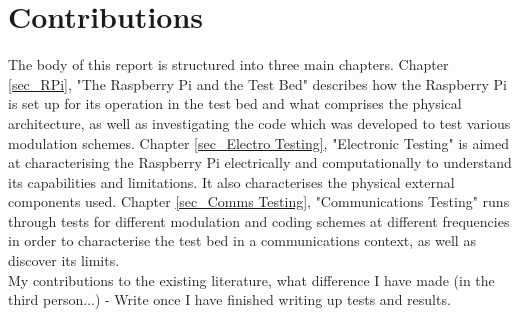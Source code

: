 \documentclass[../main.tex]{subfiles}
\begin{document}

\section{Contributions}

The body of this report is structured into three main chapters.
Chapter \ref{sec_RPi}, "The Raspberry Pi and the Test Bed" describes how the Raspberry Pi is set up for its operation in the test bed and what comprises the physical architecture, as well as investigating the code which was developed to test various modulation schemes.
Chapter \ref{sec_Electro Testing}, "Electronic Testing" is aimed at characterising the Raspberry Pi electrically and computationally to understand its capabilities and limitations.
It also characterises the physical external components used.
Chapter \ref{sec_Comms Testing}, "Communications Testing" runs through tests for different modulation and coding schemes at different frequencies in order to characterise the test bed in a communications context, as well as discover its limits.\\

My contributions to the existing literature, what difference I have made (in the third person...) - Write once I have finished writing up tests and results.
\end{document}
